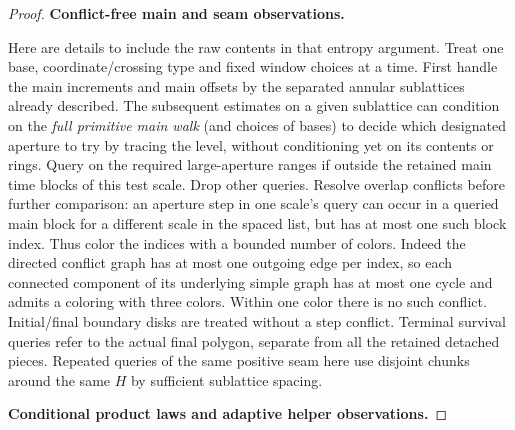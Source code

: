 \begin{proof}

\smallskip
\noindent\textbf{Conflict-free main and seam observations.}\quad

Here are details to include the raw contents in that entropy argument. Treat one base,
coordinate/crossing type and fixed window choices at a time. First handle the main
increments and main offsets by the separated annular sublattices already described. The
subsequent estimates on a given sublattice can condition on the \emph{full primitive main
walk} (and choices of bases) to decide which designated aperture to try by tracing the
level, without conditioning yet on its contents or rings. Query on the required
large-aperture ranges if outside the retained main time blocks of this test scale. Drop
other queries. Resolve overlap conflicts before further comparison: an aperture step in
one scale's query can occur in a queried main block for a different scale in the spaced
list, but has at most one such block index. Thus color the indices with a bounded number
of colors. Indeed the directed conflict graph has at most one outgoing edge per
index, so each connected component of its underlying simple graph has at most
one cycle and admits a coloring with three colors. Within one color there is no
such conflict. Initial/final boundary disks are treated without a step
conflict. Terminal survival queries refer to the actual final polygon, separate from all
the retained detached pieces. Repeated queries of the same positive seam here use disjoint
chunks around the same \(H\) by sufficient sublattice spacing.

\smallskip
\noindent\textbf{Conditional product laws and adaptive helper observations.}\quad


\end{proof}
